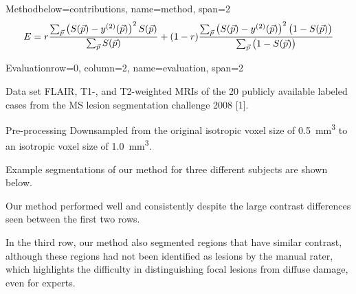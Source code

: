 \documentclass[%
portrait,paperwidth=841mm,paperheight=1180mm,%
margin=2cm,
fontscale=0.32
]{baposter}
\newcommand{\vect}[1]{\vec{#1}}
\begin{document}
\begin{poster}
\begin{headerblock}{Method}{below=contributions, name=method, span=2}
\begin{equation}
\nonumber
E = r\frac{\textstyle\sum_{\vect{p}} \left(S(\vect{p}) -
y^{(2)}(\vect{p})\right)^2 S(\vect{p})}{\textstyle\sum_{\vect{p}} S(\vect{p})}
+(1-r)\frac{\textstyle\sum_{\vect{p}} \left(S(\vect{p}) -
y^{(2)}(\vect{p})\right)^2 \big(1 - S(\vect{p})\big)}{%
\textstyle\sum_{\vect{p}}\big(1 - S(\vect{p})\big)}
\end{equation}
\vspace{0em}
\end{headerblock}


\begin{headerblock}{Evaluation}{row=0, column=2, name=evaluation, span=2}

\begin{compactdesc}
\item[Data set] FLAIR, T1-, and T2-weighted MRIs of the
20 publicly available labeled cases from the MS lesion segmentation challenge
2008 [1].
\item[Pre-processing] Downsampled from the original isotropic voxel
size of \SI{0.5}{\cubic\milli\metre} to an isotropic voxel size of
\SI{1.0}{\cubic\milli\metre}.
\end{compactdesc}
\begin{compactitem}
\item Example segmentations of our method for three different subjects are
shown below.
\item Our method performed well and consistently despite the
large contrast differences seen between the first two rows.
\item In the third row, our method also segmented regions that have similar
contrast, although these regions had not been identified as lesions by the
manual rater, which highlights the difficulty in distinguishing focal
lesions from diffuse damage, even for experts.
\end{compactitem}


\end{headerblock}
\end{poster}
\end{document}
